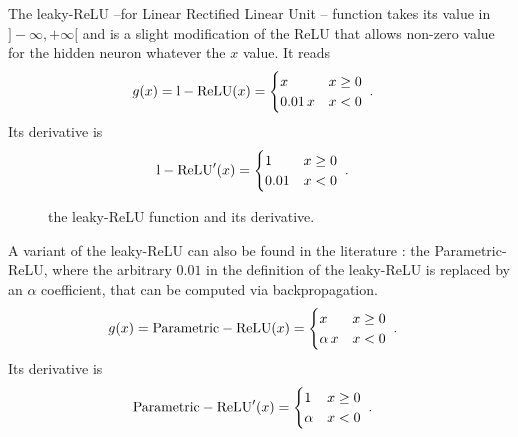 The leaky-ReLU --for Linear Rectified Linear Unit -- function takes its value in $]-\infty,+\infty[$ and is a slight modification of the ReLU that allows non-zero value for the hidden neuron whatever the $x$ value. It reads
\begin{align}
g(x)&={\rm l-ReLU}(x)=\begin{cases}
      x & x\geq 0 \\
      0.01\,x & x<0
   \end{cases}\;.
\end{align}
Its derivative is
\begin{align}
{\rm l-ReLU}'(x)&=\begin{cases}
      1 & x\geq 0 \\
      0.01 & x<0
   \end{cases}\;.
\end{align}

\begin{figure}[H]
\begin{center}
\end{center}
\caption{\label{fig:lrelu} the leaky-ReLU function and its derivative.}
\end{figure}

A variant of the leaky-ReLU can also be found in the literature : the Parametric-ReLU, where the arbitrary $0.01$ in the definition of the leaky-ReLU is replaced by an $\alpha$ coefficient, that can be
computed via backpropagation.
\begin{align}
g(x)&={\rm Parametric-ReLU}(x)=\begin{cases}
      x & x\geq 0 \\
      \alpha\,x & x<0
   \end{cases}\;.
\end{align}
Its derivative is
\begin{align}
{\rm Parametric-ReLU}'(x)&=\begin{cases}
      1 & x\geq 0 \\
      \alpha & x<0
   \end{cases}\;.
\end{align}

